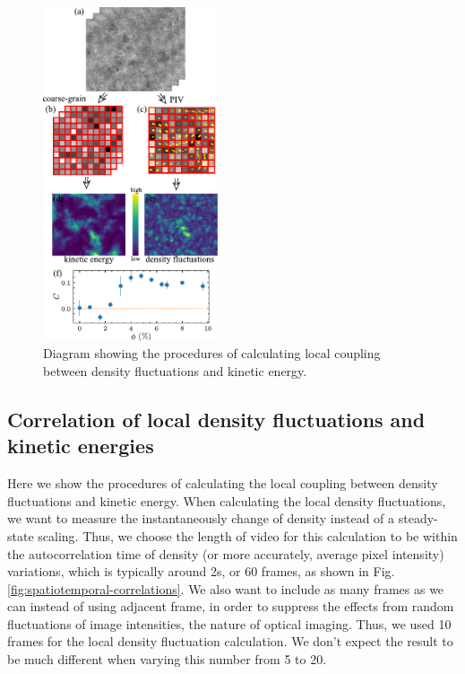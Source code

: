 \documentclass[twocolumn,aps,prx,amsmath,amssymb,longbibliography]{revtex4-2}
\begin{document}
\begin{figure}[t]
	\begin{center}
		\includegraphics[width=0.46\textwidth]{Figures/local-correlation/v1.pdf}
		\caption[Density autocorrelation]
		{
			Diagram showing the procedures of calculating local coupling between density fluctuations and kinetic energy.
		}
		\label{fig:coupling-calculation}
	\end{center}
\end{figure}

\subsection{Correlation of local density fluctuations and kinetic energies}


Here we show the procedures of calculating the local coupling between density fluctuations and kinetic energy. When calculating the local density fluctuations, we want to measure the instantaneously change of density instead of a steady-state scaling. Thus, we choose the length of video for this calculation to be within the autocorrelation time of density (or more accurately, average pixel intensity) variations, which is typically around 2s, or 60 frames, as shown in Fig.\ref{fig:spatiotemporal-correlations}. We also want to include as many frames as we can instead of using adjacent frame, in order to suppress the effects from random fluctuations of image intensities, the nature of optical imaging. Thus, we used 10 frames for the local density fluctuation calculation. We don't expect the result to be much different when varying this number from 5 to 20.
\end{document}
